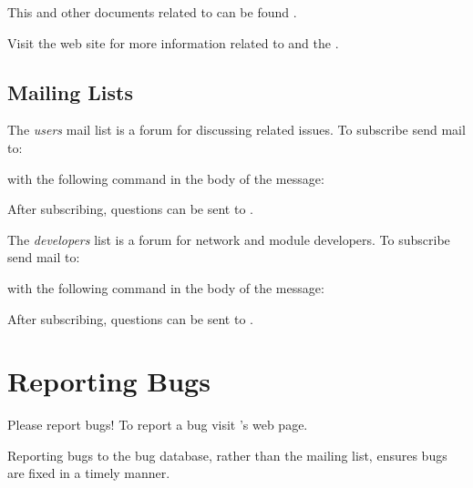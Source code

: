 This and other documents related to \sr{} can be found 
.

Visit the \sci{} web site for more
information related to \sr{} and the \scii{}.

\subsection{Mailing Lists}

The \sr{} \emph{users} mail list is a forum for discussing \sr{}
related issues.  To subscribe send mail to:


with the following command in the body of the message:


After subscribing,  questions can be sent to
.

The \sr{} \emph{developers} list is a forum for network and module
developers.  To subscribe send mail to:


with the following command in the body of the message:


After subscribing, questions can be sent to
.

\section{Reporting Bugs}
\label{sec:bugs}

Please report bugs!  To report a bug visit \sr{}'s
 web page.

Reporting bugs to the bug database, rather than the mailing list,  ensures
bugs are fixed in a timely manner.

